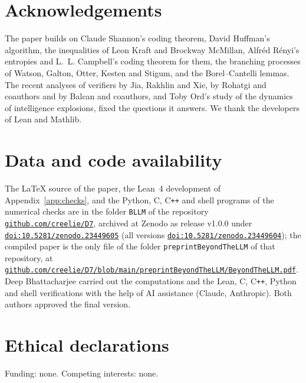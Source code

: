 \section*{Acknowledgements}
The paper builds on Claude Shannon's coding theorem, David Huffman's algorithm, the inequalities of Leon Kraft and Brockway McMillan, Alfr\'ed R\'enyi's entropies and L.~L. Campbell's coding theorem for them, the branching processes of Watson, Galton, Otter, Kesten and Stigum, and the Borel--Cantelli lemmas. The recent analyses of verifiers by Jia, Rakhlin and Xie, by Rohatgi and coauthors and by Balcan and coauthors, and Toby Ord's study of the dynamics of intelligence explosions, fixed the questions it answers. We thank the developers of Lean and Mathlib.

\section*{Data and code availability}
The \LaTeX{} source of the paper, the Lean~4 development of Appendix~\ref{app:checks}, and the Python, C, C\texttt{++} and shell programs of the numerical checks are in the folder \texttt{BLLM} of the repository \href{https://github.com/creelie/D7}{\nolinkurl{github.com/creelie/D7}}, archived at Zenodo as release v1.0.0 under \href{https://doi.org/10.5281/zenodo.23449605}{\nolinkurl{doi:10.5281/zenodo.23449605}} (all versions \href{https://doi.org/10.5281/zenodo.23449604}{\nolinkurl{doi:10.5281/zenodo.23449604}}); the compiled paper is the only file of the folder \texttt{preprintBeyondTheLLM} of that repository, at \href{https://github.com/creelie/D7/blob/main/preprintBeyondTheLLM/BeyondTheLLM.pdf}{\nolinkurl{github.com/creelie/D7/blob/main/preprintBeyondTheLLM/BeyondTheLLM.pdf}}. Deep Bhattacharjee carried out the computations and the Lean, C, C\texttt{++}, Python and shell verifications with the help of AI assistance (Claude, Anthropic). Both authors approved the final version.

\section*{Ethical declarations}
Funding: none. Competing interests: none.
